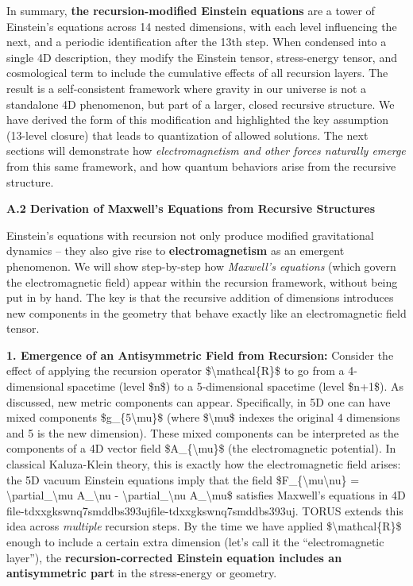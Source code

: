 \documentclass[]{article}
\begin{document}
In summary, \textbf{the recursion-modified Einstein equations} are a
tower of Einstein's equations across 14 nested dimensions, with each
level influencing the next, and a periodic identification after the 13th
step. When condensed into a single 4D description, they modify the
Einstein tensor, stress-energy tensor, and cosmological term to include
the cumulative effects of all recursion layers​. The result is a
self-consistent framework where gravity in our universe is not a
standalone 4D phenomenon, but part of a larger, closed recursive
structure. We have derived the form of this modification and highlighted
the key assumption (13-level closure) that leads to quantization of
allowed solutions. The next sections will demonstrate how
\emph{electromagnetism and other forces naturally emerge} from this same
framework, and how quantum behaviors arise from the recursive structure.

\textbf{A.2 Derivation of Maxwell's Equations from Recursive Structures}

Einstein's equations with recursion not only produce modified
gravitational dynamics -- they also give rise to
\textbf{electromagnetism} as an emergent phenomenon. We will show
step-by-step how \emph{Maxwell's equations} (which govern the
electromagnetic field) appear within the recursion framework, without
being put in by hand. The key is that the recursive addition of
dimensions introduces new components in the geometry that behave exactly
like an electromagnetic field tensor.

\textbf{1. Emergence of an Antisymmetric Field from Recursion:} Consider
the effect of applying the recursion operator
\$\textbackslash{}mathcal\{R\}\$ to go from a 4-dimensional spacetime
(level \$n\$) to a 5-dimensional spacetime (level \$n+1\$). As
discussed, new metric components can appear. Specifically, in 5D one can
have mixed components \$g\_\{5\textbackslash{}mu\}\$ (where
\$\textbackslash{}mu\$ indexes the original 4 dimensions and 5 is the
new dimension). These mixed components can be interpreted as the
components of a 4D vector field \$A\_\{\textbackslash{}mu\}\$ (the
electromagnetic potential). In classical Kaluza-Klein theory, this is
exactly how the electromagnetic field arises: the 5D vacuum Einstein
equations imply that the field
\$F\_\{\textbackslash{}mu\textbackslash{}nu\} =
\textbackslash{}partial\_\textbackslash{}mu A\_\textbackslash{}nu -
\textbackslash{}partial\_\textbackslash{}nu A\_\textbackslash{}mu\$
satisfies Maxwell's equations in
4D​file-tdxxgkswnq7smddbs393uj​file-tdxxgkswnq7smddbs393uj. TORUS
extends this idea across \emph{multiple} recursion steps. By the time we
have applied \$\textbackslash{}mathcal\{R\}\$ enough to include a
certain extra dimension (let's call it the ``electromagnetic layer''),
the \textbf{recursion-corrected Einstein equation includes an
antisymmetric part} in the stress-energy or geometry.
\end{document}
